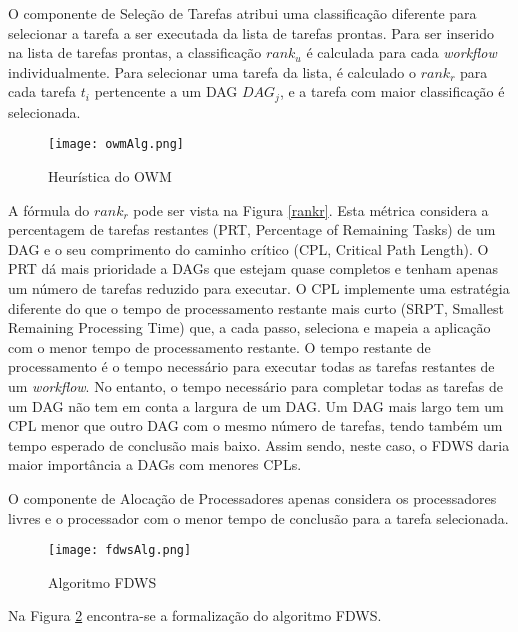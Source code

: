 O componente de Seleção de Tarefas atribui uma classificação diferente para selecionar a tarefa a ser executada da lista de tarefas prontas. Para ser inserido na lista de tarefas prontas, a classificação $rank_u$ é calculada para cada \textit{workflow} individualmente. Para selecionar uma tarefa da lista, é calculado o $rank_r$ para cada tarefa $t_i$ pertencente a um DAG $DAG_j$, e a tarefa com maior classificação é selecionada. 

\begin{figure}[H]
	\centering
	\texttt{[image: owmAlg.png]}
	\caption{Heurística do OWM}
	\label{Fórmula de $rank_u$}
\end{figure}

A fórmula do $rank_r$ pode ser vista na Figura \ref{rankr}. Esta métrica considera a percentagem de tarefas restantes (PRT, Percentage of Remaining Tasks) de um DAG e o seu comprimento do caminho crítico (CPL, Critical Path Length). O PRT dá mais prioridade a DAGs que estejam quase completos e tenham apenas um número de tarefas reduzido para executar. O CPL implemente uma estratégia diferente do que o tempo de processamento restante mais curto (SRPT, Smallest Remaining Processing Time) \cite{Maheswaran1999} que, a cada passo, seleciona e mapeia a aplicação com o menor tempo de processamento restante. O tempo restante de processamento é o tempo necessário para executar todas as tarefas restantes de um \textit{workflow}. No entanto, o tempo necessário para completar todas as tarefas de um DAG não tem em conta a largura de um DAG. Um DAG mais largo tem um CPL menor que outro DAG com o mesmo número de tarefas, tendo também um tempo esperado de conclusão mais baixo. Assim sendo, neste caso, o FDWS daria maior importância a DAGs com menores CPLs.

O componente de Alocação de Processadores apenas considera os processadores livres e o processador com o menor tempo de conclusão para a tarefa selecionada.

\begin{figure}[H]
	\centering
	\texttt{[image: fdwsAlg.png]}
	\caption{Algoritmo FDWS}
	\label{fdwsAlg}
\end{figure}

Na Figura \ref{fdwsAlg} encontra-se a formalização do algoritmo FDWS.

